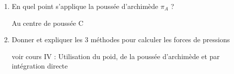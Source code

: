 \documentclass{article}
\begin{document}
\begin{enumerate}[label=\arabic{enumi} - , left=0pt, itemsep=1em]
\begin{solution}
         \end{solution}

         \item En quel point s'applique la poussée d'archimède $\pi_A$ ? \par
         \begin{solution}
            Au centre de poussée C
          \end{solution}


         \item Donner et expliquer les 3 méthodes pour calculer les forces de pressions \par
         \begin{solution}
            voir cours IV : Utilisation du poid, de la poussée d'archimède et par intégration directe
          \end{solution}
\end{enumerate}
\end{document}
